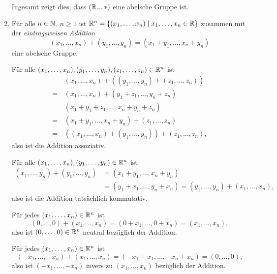 \begin{enumerate}[leftmargin=*]
  Ingesamt zeigt dies, dass $(\mathbb{R}_-, *)$ eine abelsche Gruppe ist.
 \item
  Für alle $n \in \mathbb{N}$, $n \geq 1$ ist $\mathbb{R}^n = \{(x_1, \dotsc, x_n) \mid x_1, \dotsc, x_n \in \mathbb{R}\}$ zusammen mit der \emph{eintragsweisen Addition}
  \[
   (x_1, \dotsc, x_n) + (y_1, \dotsc, y_n)
   = (x_1 + y_1, \dotsc, x_n + y_n)
  \]
  eine abelsche Gruppe:
  
  Für alle $(x_1, \dotsc, x_n), (y_1, \dotsc, y_n), (z_1, \dotsc, z_n) \in \mathbb{R}^n$ ist
  \begin{align*}
    &\, (x_1, \dotsc, x_n) + ( (y_1, \dotsc, y_n) + (z_1, \dotsc, z_n) ) \\
   =&\, (x_1, \dotsc, x_n) + (y_1 + z_1, \dotsc, y_n + z_n) \\
   =&\, (x_1 + y_1 + z_1, \dotsc, x_n + y_n + z_n) \\
   =&\, (x_1 + y_1, \dotsc, x_n + y_n) + (z_1, \dotsc, z_n) \\
   =&\, ( (x_1, \dotsc, x_n) + (y_1, \dotsc, y_n) ) + (z_1, \dotsc, z_n),
  \end{align*}
  also ist die Addition assoziativ.
  
  Für alle $(x_1, \dotsc, x_n), (y_1, \dotsc, y_n) \in \mathbb{R}^n$ ist
  \begin{align*}
   (x_1, \dotsc, y_n) + (y_1, \dotsc, y_n)
   &= (x_1 + y_1, \dotsc, x_n + y_n) \\
   &= (y_1 + x_1, \dotsc, y_n + x_n)
   = (y_1, \dotsc, y_n) + (x_1, \dotsc, x_n),
  \end{align*}
  also ist die Addition tatsächlich kommutativ.
  
  Für jedes $(x_1, \dotsc, x_n) \in \mathbb{R}^n$ ist
  \[
   (0, \dotsc, 0) + (x_1, \dotsc, x_n)
   = (0 + x_1, \dotsc, 0 + x_n)
   = (x_1, \dotsc, x_n),
  \]
  also ist $(0, \dotsc, 0) \in \mathbb{R}^n$ neutral bezüglich der Addition.
  
  Für jedes $(x_1, \dotsc, x_n) \in \mathbb{R}^n$ ist
  \[
   (-x_1, \dotsc, -x_n) + (x_1, \dotsc, x_n)
   = (-x_1 + x_1, \dotsc, -x_n + x_n)
   = (0, \dotsc, 0),
  \]
  also ist $(-x_1, \dotsc, -x_n)$ invers zu $(x_1, \dotsc, x_n)$ bezüglich der Addition.
  

\end{enumerate}
